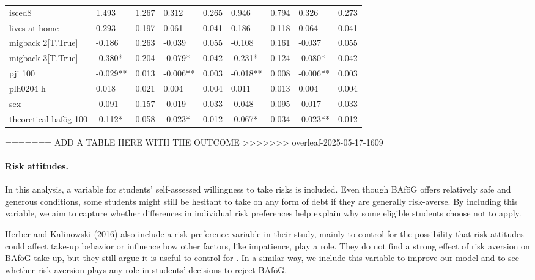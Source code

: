 \begin{table}
\begin{tabular}{lllllllll}
isced8                  & 1.493     & 1.267     & 0.312      & 0.265      & 0.946     & 0.794      & 0.326      & 0.273     \\
lives at home           & 0.293     & 0.197     & 0.061      & 0.041      & 0.186     & 0.118      & 0.064      & 0.041     \\
migback 2[T.True]       & -0.186    & 0.263     & -0.039     & 0.055      & -0.108    & 0.161      & -0.037     & 0.055     \\
migback 3[T.True]       & -0.380*   & 0.204     & -0.079*    & 0.042      & -0.231*   & 0.124      & -0.080*    & 0.042     \\
pji 100                 & -0.029**  & 0.013     & -0.006**   & 0.003      & -0.018**  & 0.008      & -0.006**   & 0.003     \\
plh0204 h               & 0.018     & 0.021     & 0.004      & 0.004      & 0.011     & 0.013      & 0.004      & 0.004     \\
sex                     & -0.091    & 0.157     & -0.019     & 0.033      & -0.048    & 0.095      & -0.017     & 0.033     \\
theoretical bafög 100   & -0.112*   & 0.058     & -0.023*    & 0.012      & -0.067*   & 0.034      & -0.023**   & 0.012     \\
\bottomrule
\end{tabular}
\end{table}





=======
ADD A TABLE HERE WITH THE OUTCOME
>>>>>>> overleaf-2025-05-17-1609

\paragraph{Risk attitudes.} In this analysis, a variable for students' self-assessed willingness to take risks is included. Even though BAföG offers relatively safe and generous conditions, some students might still be hesitant to take on any form of debt if they are generally risk-averse. By including this variable, we aim to capture whether differences in individual risk preferences help explain why some eligible students choose not to apply.

Herber and Kalinowski (2016) also include a risk preference variable in their study, mainly to control for the possibility that risk attitudes could affect take-up behavior or influence how other factors, like impatience, play a role. They do not find a strong effect of risk aversion on BAföG take-up, but they still argue it is useful to control for \citep{herber_non-take-up_2019}. In a similar way, we include this variable to improve our model and to see whether risk aversion plays any role in students’ decisions to reject BAföG.

